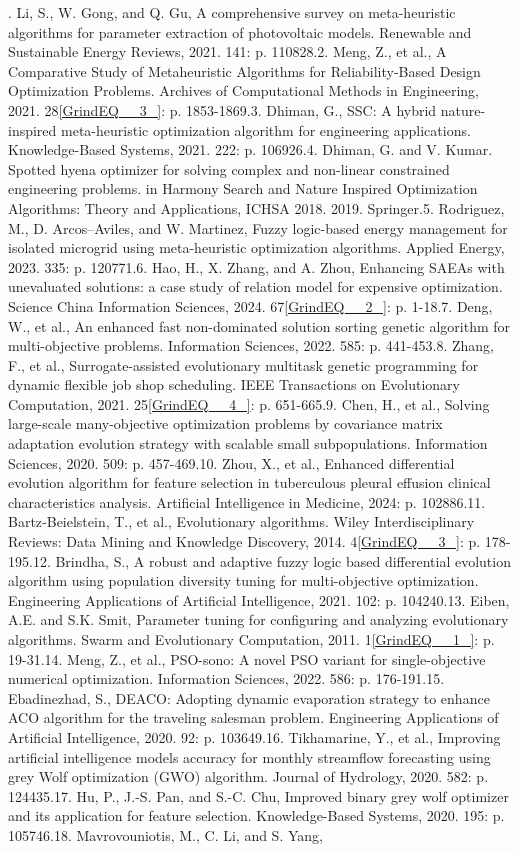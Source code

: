 \documentclass{article} %
\begin{document}
. Li, S., W. Gong, and Q. Gu, A comprehensive survey on meta-heuristic algorithms for parameter extraction of photovoltaic models. Renewable and Sustainable Energy Reviews, 2021. 141: p. 110828.2. Meng, Z., et al., A Comparative Study of Metaheuristic Algorithms for Reliability-Based Design Optimization Problems. Archives of Computational Methods in Engineering, 2021. 28\eqref{GrindEQ__3_}: p. 1853-1869.3. Dhiman, G., SSC: A hybrid nature-inspired meta-heuristic optimization algorithm for engineering applications. Knowledge-Based Systems, 2021. 222: p. 106926.4. Dhiman, G. and V. Kumar. Spotted hyena optimizer for solving complex and non-linear constrained engineering problems. in Harmony Search and Nature Inspired Optimization Algorithms: Theory and Applications, ICHSA 2018. 2019. Springer.5. Rodriguez, M., D. Arcos--Aviles, and W. Martinez, Fuzzy logic-based energy management for isolated microgrid using meta-heuristic optimization algorithms. Applied Energy, 2023. 335: p. 120771.6. Hao, H., X. Zhang, and A. Zhou, Enhancing SAEAs with unevaluated solutions: a case study of relation model for expensive optimization. Science China Information Sciences, 2024. 67\eqref{GrindEQ__2_}: p. 1-18.7. Deng, W., et al., An enhanced fast non-dominated solution sorting genetic algorithm for multi-objective problems. Information Sciences, 2022. 585: p. 441-453.8. Zhang, F., et al., Surrogate-assisted evolutionary multitask genetic programming for dynamic flexible job shop scheduling. IEEE Transactions on Evolutionary Computation, 2021. 25\eqref{GrindEQ__4_}: p. 651-665.9. Chen, H., et al., Solving large-scale many-objective optimization problems by covariance matrix adaptation evolution strategy with scalable small subpopulations. Information Sciences, 2020. 509: p. 457-469.10. Zhou, X., et al., Enhanced differential evolution algorithm for feature selection in tuberculous pleural effusion clinical characteristics analysis. Artificial Intelligence in Medicine, 2024: p. 102886.11. Bartz‐Beielstein, T., et al., Evolutionary algorithms. Wiley Interdisciplinary Reviews: Data Mining and Knowledge Discovery, 2014. 4\eqref{GrindEQ__3_}: p. 178-195.12. Brindha, S., A robust and adaptive fuzzy logic based differential evolution algorithm using population diversity tuning for multi-objective optimization. Engineering Applications of Artificial Intelligence, 2021. 102: p. 104240.13. Eiben, A.E. and S.K. Smit, Parameter tuning for configuring and analyzing evolutionary algorithms. Swarm and Evolutionary Computation, 2011. 1\eqref{GrindEQ__1_}: p. 19-31.14. Meng, Z., et al., PSO-sono: A novel PSO variant for single-objective numerical optimization. Information Sciences, 2022. 586: p. 176-191.15. Ebadinezhad, S., DEACO: Adopting dynamic evaporation strategy to enhance ACO algorithm for the traveling salesman problem. Engineering Applications of Artificial Intelligence, 2020. 92: p. 103649.16. Tikhamarine, Y., et al., Improving artificial intelligence models accuracy for monthly streamflow forecasting using grey Wolf optimization (GWO) algorithm. Journal of Hydrology, 2020. 582: p. 124435.17. Hu, P., J.-S. Pan, and S.-C. Chu, Improved binary grey wolf optimizer and its application for feature selection. Knowledge-Based Systems, 2020. 195: p. 105746.18. Mavrovouniotis, M., C. Li, and S. Yang, 
\end{document}
